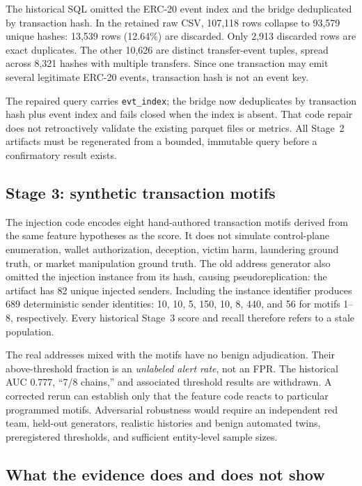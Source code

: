 The historical SQL omitted the ERC-20 event index and the bridge deduplicated
by transaction hash.  In the retained raw CSV, 107,118 rows collapse to 93,579
unique hashes: 13,539 rows (12.64\%) are discarded.  Only 2,913 discarded rows
are exact duplicates.  The other 10,626 are distinct transfer-event tuples,
spread across 8,321 hashes with multiple transfers.  Since one transaction may
emit several legitimate ERC-20 events, transaction hash is not an event key.

The repaired query carries \texttt{evt\_index}; the bridge now deduplicates by
transaction hash plus event index and fails closed when the index is absent.
That code repair does not retroactively validate the existing parquet files or
metrics.  All Stage~2 artifacts must be regenerated from a bounded, immutable
query before a confirmatory result exists.

\subsection{Stage 3: synthetic transaction motifs}

The injection code encodes eight hand-authored transaction motifs derived from
the same feature hypotheses as the score.  It does not simulate control-plane
enumeration, wallet authorization, deception, victim harm, laundering ground
truth, or market manipulation ground truth.  The old address generator also
omitted the injection instance from its hash, causing pseudoreplication: the
artifact has 82 unique injected senders.  Including the instance identifier
produces 689 deterministic sender identities: 10, 10, 5, 150, 10, 8, 440, and
56 for motifs 1--8, respectively.  Every historical Stage~3 score and recall
therefore refers to a stale population.

The real addresses mixed with the motifs have no benign adjudication.  Their
above-threshold fraction is an \emph{unlabeled alert rate}, not an FPR.  The
historical AUC 0.777, ``7/8 chains,'' and associated threshold results are
withdrawn.  A corrected rerun can establish only that the feature code reacts
to particular programmed motifs.  Adversarial robustness would require an
independent red team, held-out generators, realistic histories and benign
automated twins, preregistered thresholds, and sufficient entity-level sample
sizes.

\subsection{What the evidence does and does not show}

